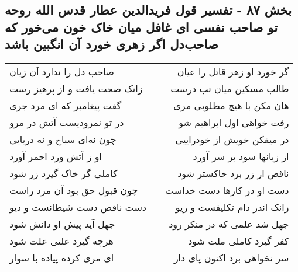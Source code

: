 \begin{center}
\section*{بخش ۸۷ - تفسیر قول فریدالدین عطار قدس الله روحه تو صاحب نفسی ای غافل میان خاک خون می‌خور که صاحب‌دل اگر زهری خورد آن انگبین باشد}
\label{sec:sh087}
\begin{longtable}{l p{0.5cm} r}
صاحب دل را ندارد آن زیان
&&
گر خورد او زهر قاتل را عیان
\\
زانک صحت یافت و از پرهیز رست
&&
طالب مسکین میان تب درست
\\
گفت پیغامبر که ای مرد جری
&&
هان مکن با هیچ مطلوبی مری
\\
در تو نمرودیست آتش در مرو
&&
رفت خواهی اول ابراهیم شو
\\
چون نه‌ای سباح و نه دریایی
&&
در میفکن خویش از خودراییی
\\
او ز آتش ورد احمر آورد
&&
از زیانها سود بر سر آورد
\\
کاملی گر خاک گیرد زر شود
&&
ناقص ار زر برد خاکستر شود
\\
چون قبول حق بود آن مرد راست
&&
دست او در کارها دست خداست
\\
دست ناقص دست شیطانست و دیو
&&
زانک اندر دام تکلیفست و ریو
\\
جهل آید پیش او دانش شود
&&
جهل شد علمی که در منکر رود
\\
هرچه گیرد علتی علت شود
&&
کفر گیرد کاملی ملت شود
\\
ای مری کرده پیاده با سوار
&&
سر نخواهی برد اکنون پای دار
\\
\end{longtable}
\end{center}
